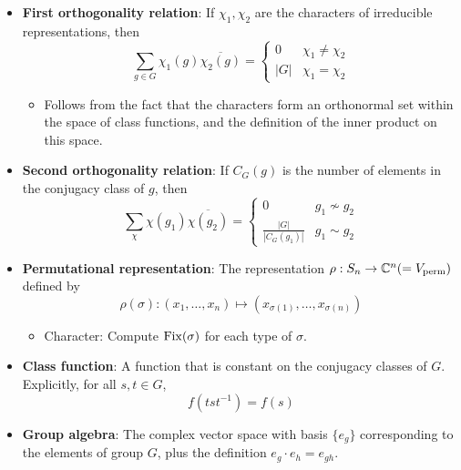 \documentclass[../notes.tex]{subfiles}
\begin{document}
\begin{itemize}
\begin{equation*}
    \end{equation*}
    \item \textbf{First orthogonality relation}: If $\chi_1,\chi_2$ are the characters of irreducible representations, then
    \begin{equation*}
        \sum_{g\in G}\chi_1(g)\overline{\chi_2(g)} =
        \begin{cases}
            0 & \chi_1\neq\chi_2\\
            |G| & \chi_1=\chi_2
        \end{cases}
    \end{equation*}
    \begin{itemize}
        \item Follows from the fact that the characters form an orthonormal set within the space of class functions, and the definition of the inner product on this space.
    \end{itemize}
    \item \textbf{Second orthogonality relation}: If $C_G(g)$ is the number of elements in the conjugacy class of $g$, then
    \begin{equation*}
        \sum_\chi\chi(g_1)\overline{\chi(g_2)} =
        \begin{cases}
            0 & g_1\nsim g_2\\
            \frac{|G|}{|C_G(g_1)|} & g_1\sim g_2
        \end{cases}
    \end{equation*}
    \item \textbf{Permutational representation}: The representation $\rho:S_n\to\mathbb{C}^n(=V_\text{perm})$ defined by
    \begin{equation*}
        \rho(\sigma):(x_1,\dots,x_n)\mapsto(x_{\sigma(1)},\dots,x_{\sigma(n)})
    \end{equation*}
    \begin{itemize}
        \item Character: Compute $\operatorname{Fix}(\sigma)$ for each type of $\sigma$.
    \end{itemize}
    \item \textbf{Class function}: A function that is constant on the conjugacy classes of $G$. Explicitly, for all $s,t\in G$,
    \begin{equation*}
        f(tst^{-1}) = f(s)
    \end{equation*}
    \item \textbf{Group algebra}: The complex vector space with basis $\{e_g\}$ corresponding to the elements of group $G$, plus the definition $e_g\cdot e_h=e_{gh}$.

\end{itemize}
\end{document}
